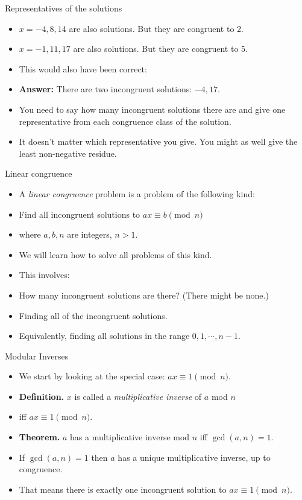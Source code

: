 \documentclass{beamer}
\begin{document}
\begin{frame}{Representatives of the solutions}
\begin{itemize}
  \item $x=-4,8,14$ are also solutions. But they are congruent to 2.
  \item $x=-1,11,17$ are also solutions. But they are congruent to 5.
  \item This would also have been correct:
  \item \textbf{Answer:} There are two incongruent solutions: $-4,17$.
  \item You need to say how many incongruent solutions there are and
  give one representative from each congruence class of the solution.
  \item It doesn't matter which representative you give. You might as well give
  the least non-negative residue.
\end{itemize}
\end{frame}

\begin{frame}{Linear congruence}
\begin{itemize}
  \item A \emph{linear congruence} problem is a problem of the following kind:
  \item Find all incongruent solutions to $ax \equiv b \pmod n$
  \item where $a,b,n$ are integers,  $n>1$.
  \item We will learn how to solve all problems of this kind.
  \item This involves:
  \item How many incongruent solutions are there? (There might be none.)
  \item Finding all of the incongruent solutions.
  \item Equivalently, finding all solutions in the range $0,1,\cdots, n-1$.
\end{itemize}
\end{frame}

\begin{frame}{Modular Inverses}
\begin{itemize}
  \item We start by looking at the special case: $ax\equiv 1 \pmod n$.
  \item \textbf{Definition.} $x$ is called a \emph{multiplicative inverse}  of $a$ mod $n$
  \item iff $ax \equiv 1 \pmod n$.
  \item \textbf{Theorem.} $a$ has a multiplicative inverse mod $n$ iff $\gcd(a,n)=1$.
  \item If $\gcd(a,n) = 1$ then $a$ has a unique multiplicative inverse, up to congruence.
  \item That means there is exactly one incongruent solution to $ax\equiv 1 \pmod n$.
\end{itemize}
\end{frame}
\end{document}
